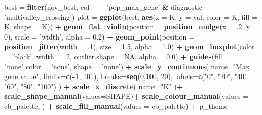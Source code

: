 \documentclass[]{book}
\newenvironment{Shaded}{\begin{snugshade}}{\end{snugshade}}
\newcommand{\DataTypeTok}[1]{\textcolor[rgb]{0.13,0.29,0.53}{#1}}
\newcommand{\DecValTok}[1]{\textcolor[rgb]{0.00,0.00,0.81}{#1}}
\newcommand{\FloatTok}[1]{\textcolor[rgb]{0.00,0.00,0.81}{#1}}
\newcommand{\KeywordTok}[1]{\textcolor[rgb]{0.13,0.29,0.53}{\textbf{#1}}}
\newcommand{\NormalTok}[1]{#1}
\newcommand{\OperatorTok}[1]{\textcolor[rgb]{0.81,0.36,0.00}{\textbf{#1}}}
\newcommand{\OtherTok}[1]{\textcolor[rgb]{0.56,0.35,0.01}{#1}}
\newcommand{\StringTok}[1]{\textcolor[rgb]{0.31,0.60,0.02}{#1}}
\begin{document}
\begin{Shaded}
\begin{Highlighting}[]
\NormalTok{best =}\StringTok{ }\KeywordTok{filter}\NormalTok{(nov_best, col }\OperatorTok{==}\StringTok{ 'pop_max_gene'} \OperatorTok{&}\StringTok{ }\NormalTok{diagnostic }\OperatorTok{==}\StringTok{ 'multivalley_crossing'}\NormalTok{)}
\NormalTok{plot =}\StringTok{  }\KeywordTok{ggplot}\NormalTok{(best, }\KeywordTok{aes}\NormalTok{(}\DataTypeTok{x =}\NormalTok{ K, }\DataTypeTok{y =}\NormalTok{ val, }\DataTypeTok{color =}\NormalTok{ K, }\DataTypeTok{fill =}\NormalTok{ K, }\DataTypeTok{shape =}\NormalTok{ K)) }\OperatorTok{+}
\StringTok{          }\KeywordTok{geom_flat_violin}\NormalTok{(}\DataTypeTok{position =} \KeywordTok{position_nudge}\NormalTok{(}\DataTypeTok{x =} \FloatTok{.2}\NormalTok{, }\DataTypeTok{y =} \DecValTok{0}\NormalTok{), }\DataTypeTok{scale =} \StringTok{'width'}\NormalTok{, }\DataTypeTok{alpha =} \FloatTok{0.2}\NormalTok{) }\OperatorTok{+}
\StringTok{          }\KeywordTok{geom_point}\NormalTok{(}\DataTypeTok{position =} \KeywordTok{position_jitter}\NormalTok{(}\DataTypeTok{width =} \FloatTok{.1}\NormalTok{), }\DataTypeTok{size =} \FloatTok{1.5}\NormalTok{, }\DataTypeTok{alpha =} \FloatTok{1.0}\NormalTok{) }\OperatorTok{+}
\StringTok{          }\KeywordTok{geom_boxplot}\NormalTok{(}\DataTypeTok{color =} \StringTok{'black'}\NormalTok{, }\DataTypeTok{width =} \FloatTok{.2}\NormalTok{, }\DataTypeTok{outlier.shape =} \OtherTok{NA}\NormalTok{, }\DataTypeTok{alpha =} \FloatTok{0.0}\NormalTok{) }\OperatorTok{+}
\StringTok{          }\KeywordTok{guides}\NormalTok{(}\DataTypeTok{fill =} \StringTok{"none"}\NormalTok{,}\DataTypeTok{color =} \StringTok{'none'}\NormalTok{, }\DataTypeTok{shape =} \StringTok{'none'}\NormalTok{) }\OperatorTok{+}
\StringTok{          }\KeywordTok{scale_y_continuous}\NormalTok{(}
            \DataTypeTok{name=}\StringTok{"Max gene value"}\NormalTok{,}
            \DataTypeTok{limits=}\KeywordTok{c}\NormalTok{(}\OperatorTok{-}\DecValTok{1}\NormalTok{, }\DecValTok{101}\NormalTok{),}
            \DataTypeTok{breaks=}\KeywordTok{seq}\NormalTok{(}\DecValTok{0}\NormalTok{,}\DecValTok{100}\NormalTok{, }\DecValTok{20}\NormalTok{),}
            \DataTypeTok{labels=}\KeywordTok{c}\NormalTok{(}\StringTok{"0"}\NormalTok{, }\StringTok{"20"}\NormalTok{, }\StringTok{"40"}\NormalTok{, }\StringTok{"60"}\NormalTok{, }\StringTok{"80"}\NormalTok{, }\StringTok{"100"}\NormalTok{)}
\NormalTok{          ) }\OperatorTok{+}
\StringTok{          }\KeywordTok{scale_x_discrete}\NormalTok{(}
            \DataTypeTok{name=}\StringTok{"K"}
\NormalTok{          )}\OperatorTok{+}
\StringTok{          }\KeywordTok{scale_shape_manual}\NormalTok{(}\DataTypeTok{values=}\NormalTok{SHAPE)}\OperatorTok{+}
\StringTok{          }\KeywordTok{scale_colour_manual}\NormalTok{(}\DataTypeTok{values =}\NormalTok{ cb_palette, ) }\OperatorTok{+}
\StringTok{          }\KeywordTok{scale_fill_manual}\NormalTok{(}\DataTypeTok{values =}\NormalTok{ cb_palette) }\OperatorTok{+}
\StringTok{          }\NormalTok{p_theme}


\end{Highlighting}
\end{Shaded}
\end{document}
